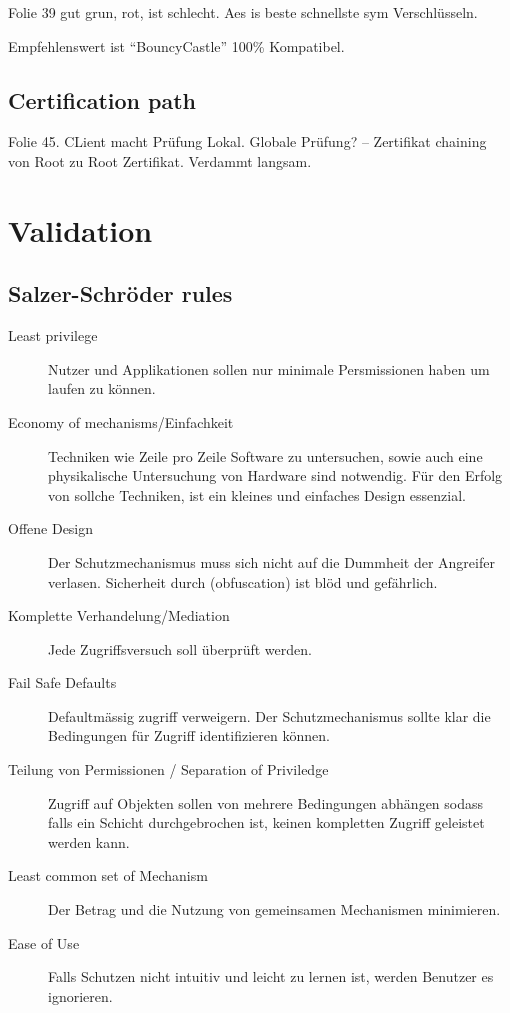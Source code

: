\documentclass[a4paper,10pt]{scrreprt}
\begin{document}
Folie 39 gut grun, rot, ist schlecht.
Aes is beste schnellste sym Verschlüsseln.


Empfehlenswert ist ``BouncyCastle'' 100\% Kompatibel.


\section{Certification path}
Folie 45. CLient macht Prüfung Lokal.
Globale Prüfung? --
Zertifikat chaining von Root zu Root Zertifikat. Verdammt langsam.


\chapter{Validation}

\section{Salzer-Schröder rules}
\begin{description}
 \item [Least privilege] Nutzer und Applikationen sollen nur minimale Persmissionen haben um laufen zu können.
 \item [Economy of mechanisms/Einfachkeit] Techniken wie Zeile pro Zeile Software zu untersuchen, sowie auch eine 
physikalische Untersuchung von Hardware sind notwendig. Für den Erfolg von sollche Techniken, ist ein kleines und 
einfaches Design essenzial.
 \item [Offene Design] Der Schutzmechanismus muss sich nicht auf die Dummheit der Angreifer verlasen. Sicherheit durch 
(obfuscation) ist blöd und gefährlich.
 \item [Komplette Verhandelung/Mediation] Jede Zugriffsversuch soll überprüft werden.
 \item [Fail Safe Defaults] Defaultmässig zugriff verweigern. Der Schutzmechanismus sollte klar die Bedingungen für 
Zugriff identifizieren können.
 \item [Teilung von Permissionen / Separation of Priviledge] Zugriff auf Objekten sollen von mehrere Bedingungen 
abhängen sodass falls ein Schicht durchgebrochen ist, keinen kompletten Zugriff geleistet werden kann.
 \item [Least common set of Mechanism] Der Betrag und die Nutzung von gemeinsamen Mechanismen minimieren.
 \item [Ease of Use] Falls Schutzen nicht intuitiv und leicht zu lernen ist, werden Benutzer es ignorieren.
 
\end{description}
\end{document}
